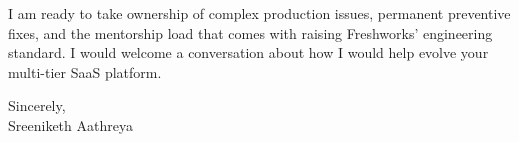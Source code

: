 \documentclass[11pt, letterpaper]{article}
\begin{document}
I am ready to take ownership of complex production issues, permanent preventive fixes, and the mentorship load that comes with raising Freshworks' engineering standard. I would welcome a conversation about how I would help evolve your multi-tier SaaS platform.

Sincerely,\\[12pt]
Sreeniketh Aathreya
\end{document}
